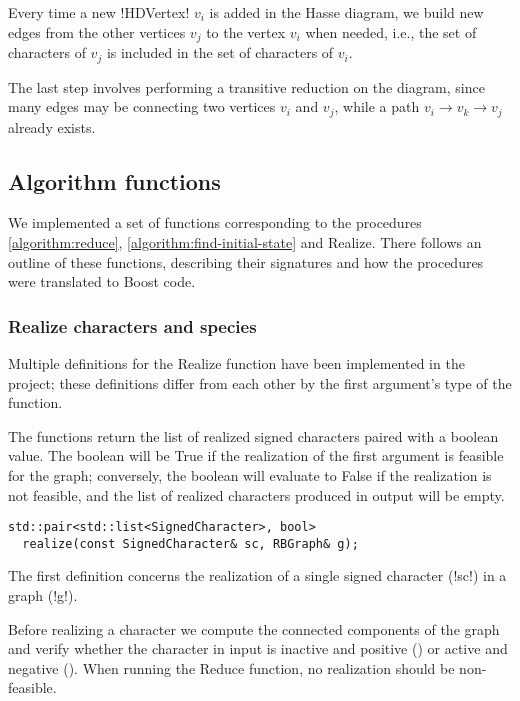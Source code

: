 Every time a new !HDVertex! $v_{i}$ is added in the Hasse diagram, we build new edges from the other vertices $v_{j}$ to the vertex $v_{i}$ when needed, i.e., the set of characters of $v_{j}$ is included in the set of characters of $v_{i}$.

The last step involves performing a transitive reduction on the diagram, since many edges may be connecting two vertices $v_{i}$ and $v_{j}$, while a path $v_{i} \rightarrow v_{k} \rightarrow v_{j}$ already exists.

\subsection{Algorithm functions}\label{section:algorithm-functions}

We implemented a set of functions corresponding to the procedures \ref{algorithm:reduce}, \ref{algorithm:find-initial-state} and Realize.
There follows an outline of these functions, describing their signatures and how the procedures were translated to Boost \cc{} code.

\subsubsection{Realize characters and species}\label{section:realize}

Multiple definitions for the Realize function have been implemented in the project; these definitions differ from each other by the first argument's type of the function.

The functions return the list of realized signed characters paired with a boolean value.
The boolean will be True if the realization of the first argument is feasible for the graph; conversely, the boolean will evaluate to False if the realization is not feasible, and the list of realized characters produced in output will be empty.

\text{}

\begin{lstlisting}[moreemph={RBGraph, SignedCharacter},
                   moreemph={[2]realize}]
  std::pair<std::list<SignedCharacter>, bool>
  realize(const SignedCharacter& sc, RBGraph& g);
\end{lstlisting}

The first definition concerns the realization of a single signed character \character[][\pm] (!sc!) in a graph \grb{} (!g!).

Before realizing a character we compute the connected components of the graph and verify whether the character in input is inactive and positive (\character[][+]) or active and negative (\character[][-]).
When running the Reduce function, no realization should be non-feasible.

